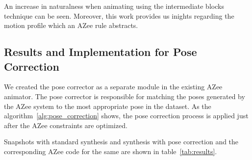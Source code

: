 \documentclass[../../main.tex]{subfiles}
\begin{document}
An increase in naturalness when animating using the intermediate blocks technique can be seen. Moreover, this work provides us inights regarding the motion profile which an AZee rule abstracts.

\subsection{Results and Implementation for Pose Correction}
\label{ch:intermediate_blocks_pose_correction:results:intermediate_block_generation}

We created the pose corrector as a separate module in the existing AZee animator. The pose corrector is responsible for matching the poses generated by the AZee system to the most appropriate pose in the dataset. As the algorithm~\ref{alg:pose_correction} shows, the pose correction process is applied just after the AZee constraints are optimized.

Snapshots with standard synthesis and synthesis with pose correction and the corresponding AZee code for the same are shown in table~\ref{tab:results}.
\end{document}
